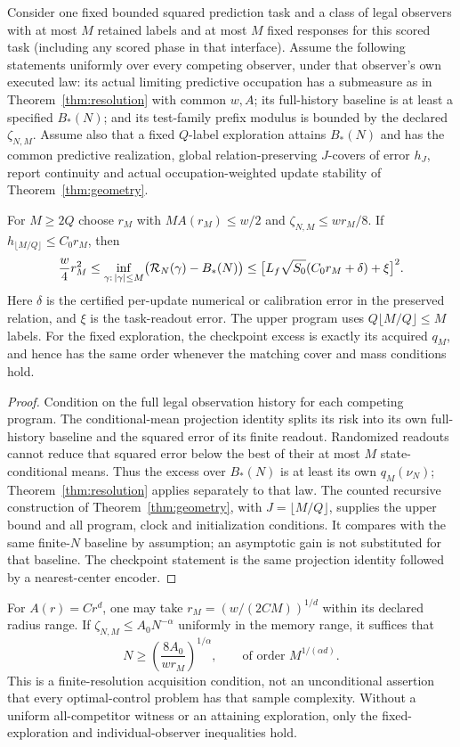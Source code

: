 \begin{corollary}\label{cor:resolution-memory}
Consider one fixed bounded squared prediction task and a class of legal observers with at most $M$ retained labels and at most $M$ fixed responses for this scored task (including any scored phase in that interface). Assume the following statements uniformly over every competing observer, under that observer's own executed law: its actual limiting predictive occupation has a submeasure as in Theorem~\ref{thm:resolution} with common $w,A$; its full-history baseline is at least a specified $B_*(N)$; and its test-family prefix modulus is bounded by the declared $\zeta_{N,M}$. Assume also that a fixed $Q$-label exploration attains $B_*(N)$ and has the common predictive realization, global relation-preserving $J$-covers of error $h_J$, report continuity and actual occupation-weighted update stability of Theorem~\ref{thm:geometry}.

For $M\ge2Q$ choose $r_M$ with $M A(r_M)\le w/2$ and $\zeta_{N,M}\le wr_M/8$. If $h_{\lfloor M/Q\rfloor}\le C_0r_M$, then
\begin{equation}\label{eq:resolution-memory}
 \frac w4r_M^2\le
 \inf_{\gamma:\,|\gamma|\le M}\bigl(\mathcal R_N(\gamma)-B_*(N)\bigr)
 \le\bigl[L_f\sqrt{S_0}(C_0r_M+\delta)+\xi\bigr]^2.
\end{equation}
Here $\delta$ is the certified per-update numerical or calibration error in the preserved relation, and $\xi$ is the task-readout error. The upper program uses $Q\lfloor M/Q\rfloor\le M$ labels. For the fixed exploration, the checkpoint excess is exactly its acquired $q_M$, and hence has the same order whenever the matching cover and mass conditions hold.
\end{corollary}
\begin{proof}
Condition on the full legal observation history for each competing program. The conditional-mean projection identity splits its risk into its own full-history baseline and the squared error of its finite readout. Randomized readouts cannot reduce that squared error below the best of their at most $M$ state-conditional means. Thus the excess over $B_*(N)$ is at least its own $q_M(\nu_N)$; Theorem~\ref{thm:resolution} applies separately to that law. The counted recursive construction of Theorem~\ref{thm:geometry}, with $J=\lfloor M/Q\rfloor$, supplies the upper bound and all program, clock and initialization conditions. It compares with the same finite-$N$ baseline by assumption; an asymptotic gain is not substituted for that baseline. The checkpoint statement is the same projection identity followed by a nearest-center encoder.
\end{proof}
For $A(r)=Cr^d$, one may take $r_M=(w/(2CM))^{1/d}$ within its declared radius range. If $\zeta_{N,M}\le A_0N^{-\alpha}$ uniformly in the memory range, it suffices that
\[
 N\ge \left(\frac{8A_0}{wr_M}\right)^{1/\alpha},
 \qquad\text{of order }M^{1/(\alpha d)}.
\]
This is a finite-resolution acquisition condition, not an unconditional assertion that every optimal-control problem has that sample complexity. Without a uniform all-competitor witness or an attaining exploration, only the fixed-exploration and individual-observer inequalities hold.

